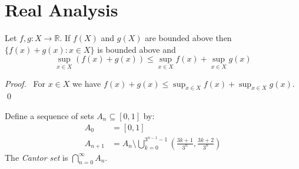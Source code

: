 \chapter{Real Analysis}

\begin{lm}
  \label{lm:analysis:sup_plus}
  Let $f, g : X \rightarrow \mathbb{R}$. If $f(X)$ and $g(X)$ are bounded above then $\{ f(x) + g(x) : x \in X \}$ is bounded above and
  \[ \sup_{x \in X} (f(x) + g(x)) \leq \sup_{x \in X} f(x) + \sup_{x \in X} g(x) \]
\end{lm}

\begin{proof}
  \pf\ For $x \in X$ we have $f(x) + g(x) \leq \sup_{x \in X} f(x) + \sup_{x \in X} g(x)$. \qed
\end{proof}

\begin{df}
  Define a sequence of sets $A_n \subseteq [0, 1]$ by:
  \begin{align*}
    A_0 & = [0,1] \\
    A_{n+1} & = A_n \setminus \bigcup_{k=0}^{3^{n-1} - 1}
    \left( \frac{3k+1}{3^n},     \frac{3k+2}{3^n} \right)
  \end{align*}
  The \emph{Cantor set} is $\bigcap_{n=0}^\infty A_n$.
\end{df}
